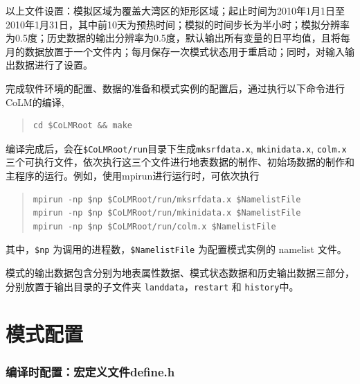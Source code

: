 \documentclass[a4paper,12pt,twoside]{article}
\begin{document}
以上文件设置：模拟区域为覆盖大湾区的矩形区域；起止时间为2010年1月1日至2010年1月31日，其中前10天为预热时间；模拟的时间步长为半小时；模拟分辨率为0.5度；历史数据的输出分辨率为0.5度，默认输出所有变量的日平均值，且将每月的数据放置于一个文件内；每月保存一次模式状态用于重启动；同时，对输入输出数据进行了设置。

完成软件环境的配置、数据的准备和模式实例的配置后，通过执行以下命令进行CoLM的编译,
\begin{quote}
\begin{lstlisting}
cd $CoLMRoot && make
\end{lstlisting}
\end{quote}
编译完成后，会在\texttt{\$CoLMRoot/run}目录下生成\texttt{mksrfdata.x}, \texttt{mkinidata.x}, \texttt{colm.x} 三个可执行文件，依次执行这三个文件进行地表数据的制作、初始场数据的制作和主程序的运行。例如，使用mpirun进行运行时，可依次执行
\begin{quote}\label{runcolm}
\begin{lstlisting}
mpirun -np $np $CoLMRoot/run/mksrfdata.x $NamelistFile
mpirun -np $np $CoLMRoot/run/mkinidata.x $NamelistFile
mpirun -np $np $CoLMRoot/run/colm.x $NamelistFile
\end{lstlisting}
\end{quote}
其中，\verb|$np| 为调用的进程数，\verb|$NamelistFile| 为配置模式实例的 namelist 文件。

模式的输出数据包含分别为地表属性数据、模式状态数据和历史输出数据三部分，分别放置于输出目录的子文件夹 \texttt{landdata}，\texttt{restart} 和 \texttt{history}中。

\clearpage

\part{模式配置}

\section{编译时配置：宏定义文件define.h}\label{define.hux6587ux4ef6}
\end{document}
